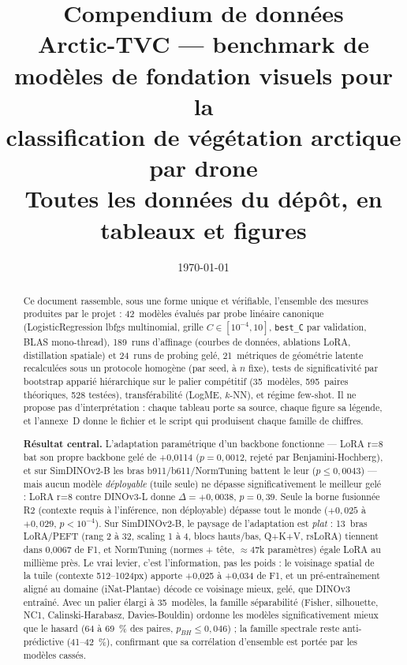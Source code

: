 \documentclass[10pt,a4paper]{article}
\title{\huge\textbf{Compendium de données}\\[4pt]
\large Arctic-TVC — benchmark de modèles de fondation visuels pour la\\
classification de végétation arctique par drone\\[6pt]
\normalsize Toutes les données du dépôt, en tableaux et figures}
\date{\today}
\begin{document}
\maketitle

\begin{abstract}
\noindent Ce document rassemble, sous une forme unique et vérifiable, l'ensemble des
mesures produites par le projet : 42~modèles évalués par probe linéaire canonique
(LogisticRegression lbfgs multinomial, grille $C\in[10^{-4},10]$, \texttt{best\_C}
par validation, BLAS mono-thread), 189~runs d'affinage (courbes de données,
ablations LoRA, distillation spatiale) et 24~runs de probing gelé, 21~métriques de
géométrie latente recalculées sous un protocole homogène (par seed, à $n$ fixe),
tests de significativité par bootstrap apparié hiérarchique sur le palier
compétitif (35~modèles, 595~paires théoriques, 528 testées), transférabilité
(LogME, $k$-NN), et régime few-shot. Il ne propose pas d'interprétation : chaque
tableau porte sa source, chaque figure sa légende, et l'annexe~D donne le fichier
et le script qui produisent chaque famille de chiffres.

\vspace{6pt}
\noindent\textbf{Résultat central.} L'adaptation paramétrique d'un backbone fonctionne
— LoRA r=8 bat son propre backbone gelé de +0,0114 ($p=0{,}0012$, rejeté par
Benjamini-Hochberg), et sur SimDINOv2-B les bras b911/b611/NormTuning battent le
leur ($p\leq0{,}0043$) — mais aucun modèle \emph{déployable} (tuile seule) ne
dépasse significativement le meilleur gelé : LoRA r=8 contre DINOv3-L donne
$\Delta=+0{,}0038$, $p=0{,}39$. Seule la borne fusionnée R2 (contexte requis à
l'inférence, non déployable) dépasse tout le monde ($+0{,}025$ à $+0{,}029$,
$p<10^{-4}$). Sur SimDINOv2-B, le paysage de l'adaptation est \emph{plat} :
13~bras LoRA/PEFT (rang 2 à 32, scaling 1 à 4, blocs hauts/bas, Q+K+V, rsLoRA)
tiennent dans 0,0067 de F1, et NormTuning (normes + tête, $\approx$47k paramètres)
égale LoRA au millième près. Le vrai levier, c'est l'information, pas les poids :
le voisinage spatial de la tuile (contexte 512--1024px) apporte +0,025 à +0,034 de
F1, et un pré-entraînement aligné au domaine (iNat-Plantae) décode ce voisinage
mieux, gelé, que DINOv3 entraîné. Avec un palier élargi à 35~modèles, la famille
séparabilité (Fisher, silhouette, NC1, Calinski-Harabasz, Davies-Bouldin) ordonne
les modèles significativement mieux que le hasard (64 à 69~\% des paires,
$p_{BH}\leq0{,}046$) ; la famille spectrale reste anti-prédictive (41--42~\%),
confirmant que sa corrélation d'ensemble est portée par les modèles cassés.


\end{abstract}
\end{document}
